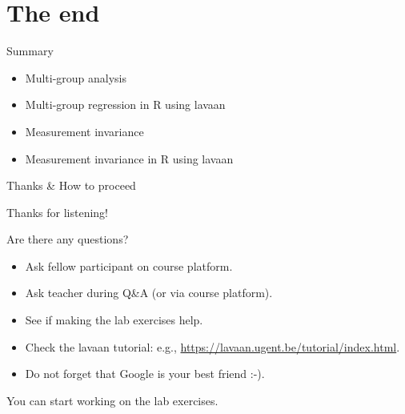 \documentclass[10pt]{beamer}\usepackage[]{graphicx}\usepackage[]{xcolor}
\begin{document}
\section{The end}
%
%
\begin{frame}{Summary}

  \begin{itemize}
      \item Multi-group analysis
      \item Multi-group regression in R using lavaan
      \item Measurement invariance
      \item Measurement invariance in R using lavaan
  \end{itemize}

\end{frame}
%
\begin{frame}{Thanks \& How to proceed}

Thanks for listening!

\vspace*{5mm}

Are there any questions?\\
\begin{itemize}
  \item Ask fellow participant on course platform.
  \item Ask teacher during Q\&A (or via course platform).
  \item See if making the lab exercises help.
  \item Check the lavaan tutorial: e.g., \url{https://lavaan.ugent.be/tutorial/index.html}.
  \item Do not forget that Google is your best friend :-).
\end{itemize}

\vspace*{5mm}

You can start working on the lab exercises.

\end{frame}
%
%
\end{document}
